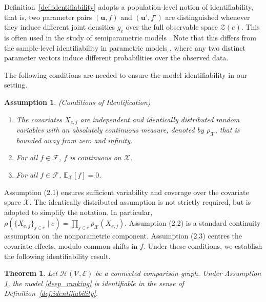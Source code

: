 \documentclass[
  12pt]{article}
\newtheorem{theorem}{Theorem}[section]
\newtheorem{assumption}{Assumption}
\begin{document}
Definition~\ref{def:identifiability} adopts a population-level notion of identifiability, that is, two parameter pairs $(\boldsymbol{u}, f)$ and $(\boldsymbol{u}', f')$ are distinguished whenever they induce different joint densities $g_e$ over the full observable space $\mathcal{Z}(e)$. This is often used in the study of semiparametric models \citep{matzkin1991semiparametric}. Note that this differs from the sample-level identifiability in parametric models \citep{fan2024uncertainty,dong2025statistical}, where any two distinct parameter vectors induce different probabilities over the observed data.

\noindent The following conditions are needed to ensure the model identifiability in our setting. 
\begin{assumption}(Conditions of Identification)
\label{ident_assumption}

\begin{enumerate}
\item[(2.1).] The covariates $X_{e, j}$ are independent and identically distributed random variables with an absolutely continuous measure, denoted by $\rho_{\mathcal{X}}$, that is bounded away from zero and infinity.
\item[(2.2).] For all $f \in \mathcal{F}$, $f$ is continuous on $\mathcal{X}$.
\item[(2.3).] For all $f \in \mathcal{F}$,\; $\mathbb{E}_{\mathcal{X}}[f] = 0$.
\end{enumerate}
\end{assumption}

\noindent Assumption (2.1) ensures sufficient variability and coverage over the covariate space $\mathcal{X}$. The identically distributed assumption is not strictly required, but is adopted to simplify the notation. In particular, $\rho(\{X_{e, j}\}_{j\in e} \mid e) 
= \prod_{j \in e}\rho_{\mathcal{X}}(X_{e,j})$. Assumption (2.2) is a standard continuity assumption on the nonparametric component. Assumption (2.3) centres the covariate effects, modulo common shifts in $f$. %
Under these conditions, we establish the following identifiability result.
\begin{theorem}
\label{lemma_ident}
Let $\mathcal{H}(\mathcal{V}, \mathcal{E})$ be a connected comparison graph. Under Assumption \ref{ident_assumption}, the model \eqref{deep_ranking} is identifiable in the sense of Definition~\ref{def:identifiability}. 
\end{theorem}
\end{document}

